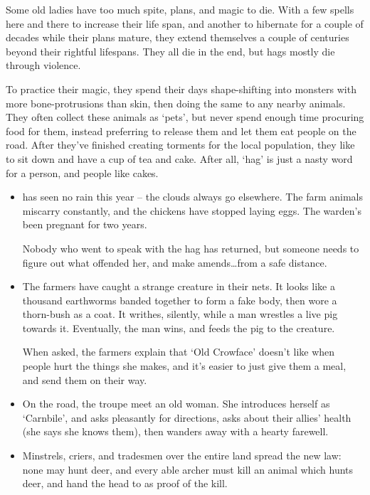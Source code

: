 \begin{multicols}{2}

\noindent
Some old ladies have too much spite, plans, and magic to die.
With a few spells here and there to increase their life span, and another to hibernate for a couple of decades while their plans mature, they extend themselves a couple of centuries beyond their rightful lifespans.
They all die in the end, but hags mostly die through violence.

To practice their magic, they spend their days shape-shifting into monsters with more bone-protrusions than skin, then doing the same to any nearby animals.
They often collect these animals as `pets', but never spend enough time procuring food for them, instead preferring to release them and let them eat people on the road.
After they've finished creating torments for the local population, they like to sit down and have a cup of tea and cake.
After all, `hag' is just a nasty word for a person, and people like cakes.

\hag

\showStdSpells

\showEnc[Hu]

\begin{itemize}
  \item
   has seen no rain this year -- the clouds always go elsewhere.
  The farm animals miscarry constantly, and the chickens have stopped laying eggs.
  The \gls{warden}'s been pregnant for two years.

  Nobody who went to speak with the hag has returned, but someone needs to figure out what offended her, and make amends\ldots from a safe distance.
  \item
  The farmers have caught a strange creature in their nets.
  It looks like a thousand earthworms banded together to form a fake body, then wore a thorn-bush as a coat.
  It writhes, silently, while a man wrestles a live pig towards it.
  Eventually, the man wins, and feeds the pig to the creature.

  When asked, the farmers explain that `Old Crowface' doesn't like when people hurt the things she makes, and it's easier to just give them a meal, and send them on their way.
  \item
  On the road, the troupe meet an old woman.
  She introduces herself as `Carnbile', and asks pleasantly for directions, asks about their allies' health (she says she knows them), then wanders away with a hearty farewell.
  \item
  Minstrels, criers, and tradesmen over the entire land spread the new law: none may hunt deer, and every able archer must kill an animal which hunts deer, and hand the head to  as proof of the kill.


\end{itemize}
\end{multicols}
